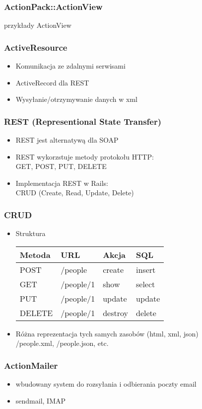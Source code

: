 \documentclass[12t]{beamer}
\begin{document}
\begin{frame}
  \frametitle{ActionPack::ActionView}
  przykłady ActionView
\end{frame}

\begin{frame}
  \frametitle{ActiveResource}
  	\begin{itemize}
			\item Komunikacja ze zdalnymi serwisami
			\item ActiveRecord dla REST
			\item Wysyłanie/otrzymywanie danych w xml
		\end{itemize}
\end{frame}

\begin{frame}
  \frametitle{REST (Representional State Transfer)}
  	\begin{itemize}
			\item REST jest alternatywą dla SOAP
			\item REST wykorzstuje metody protokołu HTTP:\\
				GET, POST, PUT, DELETE
			\item Implementacja REST w Rails:\\
				CRUD (Create, Read, Update, Delete)
			\end{itemize}
\end{frame}

\begin{frame}
  \frametitle{CRUD}
	\begin{itemize}
		\item	Struktura\\
			\begin{tabular}{l|l|l|l}
				Metoda & URL & Akcja & SQL \\
				\hline
				POST & /people & create & insert \\
				\hline
				GET & /people/1 & show & select\\
				\hline
				PUT & /people/1 & update & update\\
				\hline
				DELETE & /people/1 & destroy & delete\\
			\end{tabular}
		\item Różna reprezentacja tych samych zasobów (html, xml, json)\\
			/people.xml, /people.json, etc.
	\end{itemize}
\end{frame}

\begin{frame}
  \frametitle{ActionMailer}
  \begin{itemize}
  \item wbudowany system do rozsyłania i odbierania poczty email
  \item sendmail, IMAP
  \end{itemize}
\end{frame}
\end{document}
